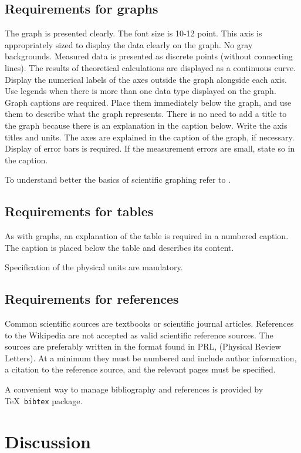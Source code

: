 \documentclass[a4paper,12pt]{article}
\begin{document}
\subsection{Requirements for graphs}
The graph is presented clearly. The font size is 10-12 point. 
This axis is appropriately sized to display the data clearly on the graph. No gray backgrounds.
Measured data is presented as discrete points (without connecting lines). The results of theoretical calculations are displayed as a continuous curve.
Display the numerical labels of the axes outside the graph alongside each axis.
Use legends when there is more than one data type displayed on the graph.
Graph captions are required.  Place them immediately below the graph, and use them to describe what the graph represents. There is no need to add a title to the graph because there is an explanation in the caption below.
Write the axis titles and units. The axes are explained in the caption of the graph, if necessary. 
Display of error bars is required. If the measurement errors are small, state so in the caption.

To understand better the basics of scientific graphing refer to \cite{Tufte01}.


\subsection{Requirements for tables}
As with graphs, an explanation of the table is required in a numbered caption. The caption is placed below the table and describes its content.

Specification of the physical units are mandatory.

\subsection{Requirements for references}
Common scientific sources are textbooks or scientific journal articles. References to the Wikipedia are not accepted as valid scientific reference sources. The sources are preferably written in the format found in PRL, (Physical Review Letters).  At a minimum they must be numbered and include author information, a citation to the reference source, and the relevant pages must be specified.

A convenient way to manage bibliography and references is provided by \TeX \  \texttt{bibtex} package.

\section{Discussion}
\end{document}
